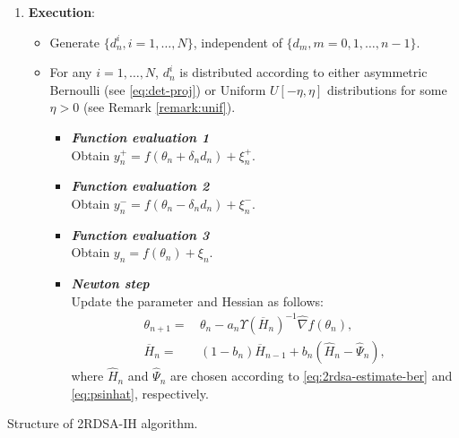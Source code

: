 \begin{algorithm}[!htp]
\begin{enumerate}
 \item \textbf{Execution}: \\
  {
 \begin{itemize}
 \item Generate $\{d_n^{i}, i=1,\ldots,N\}$, independent of $\{d_m, m=0,1,\ldots,n-1\}$.  
 \item For any $i=1,\ldots,N$, $d_n^{i}$ is distributed according to either  asymmetric Bernoulli (see \eqref{eq:det-proj}) or Uniform $U[-\eta,\eta]$ distributions for some $\eta >0$ (see Remark \ref{remark:unif}).
\begin{itemize}
\item \textbf{\emph {Function evaluation 1} }\\ \hspace{4em} Obtain $y_n^+ = f(\theta_n+\delta_n d_n) + \xi_n^+$.
\item \textbf{\emph {Function evaluation 2} }\\ \hspace{4em} Obtain $y_n^- = f(\theta_n-\delta_n d_n) + \xi_n^-$.
\item \textbf{\emph {Function evaluation 3} }\\ \hspace{4em} Obtain $y_n = f(\theta_n) + \xi_n$.
\item \textbf{\emph {Newton step}}\\ \hspace{4.2em} Update the parameter and Hessian as follows:
\begin{align*} 
\theta_{n+1} = \,& \theta_n - a_n \Upsilon(\overline H_n)^{-1}\widehat\nabla f(\theta_n),\\
\overline H_n =\,& (1-b_{n})  \overline H_{n-1} + b_{n} ( \widehat H_n - \widehat \Psi_n),
\end{align*}
where $\widehat H_n$ and $\widehat \Psi_n$ are chosen according to \eqref{eq:2rdsa-estimate-ber} and \eqref{eq:psinhat}, respectively. 
\end{itemize}

\end{itemize}
}
\end{enumerate}

\caption{Structure of 2RDSA-IH algorithm.}
\label{alg:structure}
\end{algorithm}

